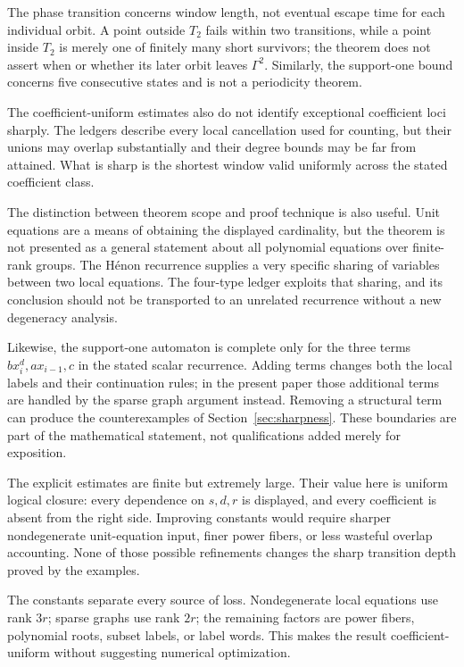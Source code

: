 \documentclass[11pt]{article}
\theoremstyle{definition}
\begin{document}
The phase transition concerns window length, not eventual escape time for each individual orbit. A point outside \(T_2\) fails within two transitions, while a point inside \(T_2\) is merely one of finitely many short survivors; the theorem does not assert when or whether its later orbit leaves \(\Gamma^2\). Similarly, the support-one bound concerns five consecutive states and is not a periodicity theorem.

The coefficient-uniform estimates also do not identify exceptional coefficient loci sharply. The ledgers describe every local cancellation used for counting, but their unions may overlap substantially and their degree bounds may be far from attained. What is sharp is the shortest window valid uniformly across the stated coefficient class.


The distinction between theorem scope and proof technique is also useful. Unit equations are a means of obtaining the displayed cardinality, but the theorem is not presented as a general statement about all polynomial equations over finite-rank groups. The Hénon recurrence supplies a very specific sharing of variables between two local equations. The four-type ledger exploits that sharing, and its conclusion should not be transported to an unrelated recurrence without a new degeneracy analysis.

Likewise, the support-one automaton is complete only for the three terms \(bx_i^d,ax_{i-1},c\) in the stated scalar recurrence. Adding terms changes both the local labels and their continuation rules; in the present paper those additional terms are handled by the sparse graph argument instead. Removing a structural term can produce the counterexamples of Section~\ref{sec:sharpness}. These boundaries are part of the mathematical statement, not qualifications added merely for exposition.

The explicit estimates are finite but extremely large. Their value here is uniform logical closure: every dependence on \(s,d,r\) is displayed, and every coefficient is absent from the right side. Improving constants would require sharper nondegenerate unit-equation input, finer power fibers, or less wasteful overlap accounting. None of those possible refinements changes the sharp transition depth proved by the examples.

The constants separate every source of loss. Nondegenerate local equations use rank \(3r\); sparse graphs use rank \(2r\); the remaining factors are power fibers, polynomial roots, subset labels, or label words. This makes the result coefficient-uniform without suggesting numerical optimization.
\end{document}
